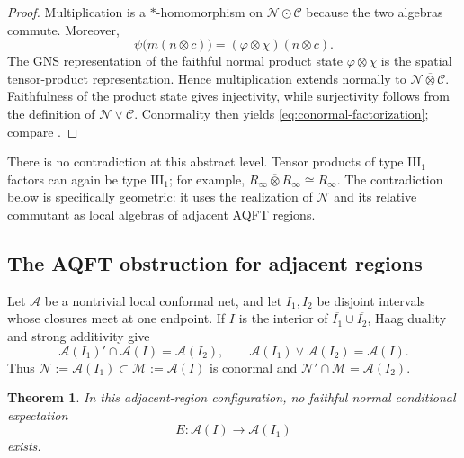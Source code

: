 \documentclass[a4paper,11pt]{article}
\newtheorem{theorem}{Theorem}
\theoremstyle{definition}
\begin{document}
\begin{proof}
Multiplication is a $*$-homomorphism on $\mathcal N\odot\mathcal C$ because
the two algebras commute.  Moreover,
\begin{equation}
 \psi\bigl(m(n\otimes c)\bigr)
 =(\varphi\otimes\chi)(n\otimes c).
\end{equation}
The GNS representation of the faithful normal product state
$\varphi\otimes\chi$ is the spatial tensor-product representation.  Hence
multiplication extends normally to $\mathcal N\overline\otimes\mathcal C$.
Faithfulness of the product state gives injectivity, while surjectivity follows
from the definition of $\mathcal N\vee\mathcal C$.  Conormality then yields
\eqref{eq:conormal-factorization}; compare
\cite{Faulkner2020,FaulknerSperanza2024}.
\end{proof}

There is no contradiction at this abstract level.  Tensor products of type
$\mathrm{III}_1$ factors can again be type $\mathrm{III}_1$; for example,
$R_\infty\overline\otimes R_\infty\cong R_\infty$.  The contradiction below
is specifically geometric: it uses the realization of $\mathcal N$ and its
relative commutant as local algebras of adjacent AQFT regions.

\subsection{The AQFT obstruction for adjacent regions}

Let $\mathcal A$ be a nontrivial local conformal net, and let $I_1,I_2$ be
disjoint intervals whose closures meet at one endpoint.  If $I$ is the interior
of $\overline{I_1}\cup\overline{I_2}$, Haag duality and strong additivity give
\begin{equation}\label{eq:adjacent-geometry}
 \mathcal A(I_1)'\cap\mathcal A(I)=\mathcal A(I_2),
 \qquad
 \mathcal A(I_1)\vee\mathcal A(I_2)=\mathcal A(I).
\end{equation}
Thus $\mathcal N:=\mathcal A(I_1)\subset\mathcal M:=\mathcal A(I)$ is
conormal and $\mathcal N'\cap\mathcal M=\mathcal A(I_2)$.

\begin{theorem}\label{thm:adjacent-no-expectation}
In this adjacent-region configuration, no faithful normal conditional
expectation
\begin{equation}
 E:\mathcal A(I)\longrightarrow\mathcal A(I_1)
\end{equation}
exists.
\end{theorem}
\end{document}
